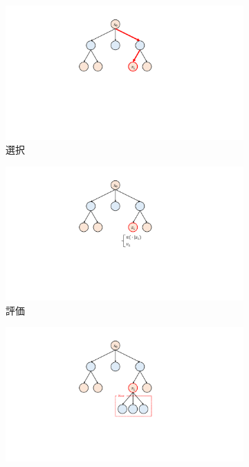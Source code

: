 \begin{figure}
  \begin{subfigure}[T]{0.4\columnwidth}
    \centering
    \includegraphics[width=\columnwidth]{figures/selection_.pdf}
    \caption{選択}
    \label{fig:selection}
  \end{subfigure}
  \begin{subfigure}[T]{0.4\columnwidth}
    \centering
    \includegraphics[width=\columnwidth]{figures/evaluate_.pdf}
    \caption{評価}
    \label{fig:evaluate}
  \end{subfigure}
  \begin{subfigure}[T]{0.4\columnwidth}
    \centering
    \includegraphics[width=\columnwidth]{figures/expand_.pdf}

\end{subfigure}
\end{figure}
